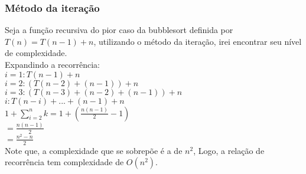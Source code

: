 \subsubsection{Método da iteração}
Seja a função recursiva do pior caso da bubblesort definida por $T(n) = T(n-1) + n$, utilizando o método da iteração, irei encontrar seu nível de complexidade. \\
Expandindo a recorrência: \\
$i = 1 : T(n - 1) + n$ \\
$i = 2 : (T(n - 2) + (n -1)) + n$ \\
$i = 3 : (T(n - 3) + (n - 2) + (n - 1)) + n$ \\
$i : T(n - i) + ... + (n - 1) + n$ \\
$1 + \sum_{i=2}^{n}k = 1 + (\frac{n(n-1)}{2} - 1)$ \\
$= \frac{n(n-1)}{2}$ \\
$= \frac{n^2 - n}{2}$ \\
Note que, a complexidade que se sobrepõe é a de $n^2$, Logo, a relação de recorrência tem complexidade de $O(n^2)$.
